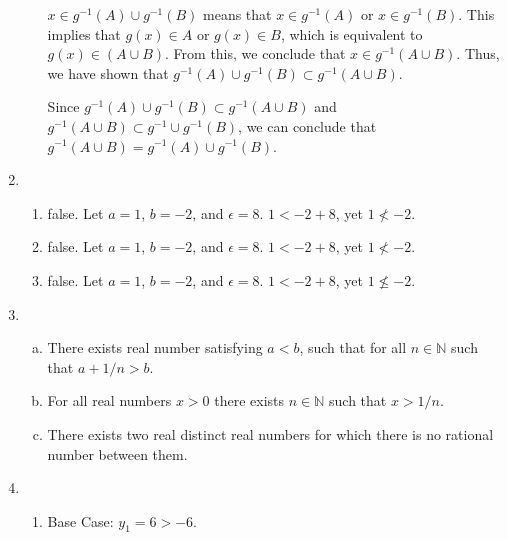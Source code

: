 \documentclass{article}
\begin{document}
\begin{enumerate}
\begin{enumerate}[(a)]
	\(x \in g^{-1} (A) \cup g^{-1} (B)\) means that \(x \in g^{-1} (A)\) or \(x \in g^{-1} (B)\). 
	This implies that \(g(x) \in A\) or \(g(x) \in B\), which is equivalent to \(g(x) \in (A \cup B)\). 
	From this, we conclude that \(x \in g^{-1} (A \cup B)\). Thus, we have shown that
	\(g^{-1} (A) \cup g^{-1} (B) \subset g^{-1} (A \cup B)\).

	Since \(g^{-1} (A) \cup g^{-1} (B) \subset g^{-1} (A \cup B)\) and
	\(g^{-1} (A \cup B) \subset g^{-1} \cup g^{-1} (B)\), we can conclude that
	\(g^{-1} (A \cup B) = g^{-1} (A) \cup g^{-1} (B)\).  


\end{enumerate}
	
\item
  \begin{enumerate}
  \item false. Let \(a = 1\), \(b = -2\), and \(\epsilon = 8\). \(1 < -2 + 8\), yet \(1 \nless -2\).
  \item false. Let \(a = 1\), \(b = -2\), and \(\epsilon = 8\). \(1 < -2 + 8\), yet \(1 \nless -2\).
  \item false. Let \(a = 1\), \(b = -2\), and \(\epsilon = 8\). \(1 < -2 + 8\), yet \(1 \nleq -2\).
  \end{enumerate}

  \item 
  \begin{enumerate}[(a)]
	  \item There exists real number satisfying \(a < b\), such that for all \(n \in \mathbb{N}\)
	such that \(a + 1 / n > b\). 

	\item For all real numbers \(x > 0\) there exists \(n \in \mathbb{N}\) such that \(x > 1 / n\). 

	\item There exists two real distinct real numbers for which there is no rational number between
	them. 
  \end{enumerate}

\item
  \begin{enumerate}
  \item Base Case: \(y_{1} = 6 > -6\).


\end{enumerate}
\end{enumerate}
\end{document}
